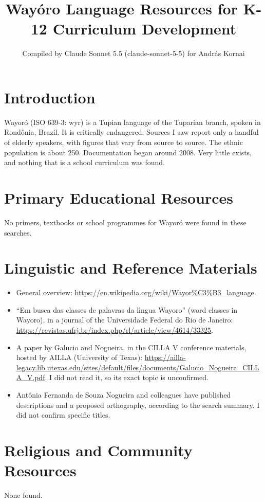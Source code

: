 \documentclass[12pt]{article}
\title{Way\'oro Language Resources for K-12 Curriculum Development}
\author{Compiled by Claude Sonnet 5.5 (claude-sonnet-5-5) for Andr\'as Kornai}
\date{}
\begin{document}
\maketitle

\section{Introduction}
Wayor\'o (ISO 639-3: wyr) is a Tupian language of the Tuparian branch, spoken in Rond\^onia, Brazil. It is critically endangered. Sources I saw report only a handful of elderly speakers, with figures that vary from source to source. The ethnic population is about 250. Documentation began around 2008. Very little exists, and nothing that is a school curriculum was found.

\section{Primary Educational Resources}
No primers, textbooks or school programmes for Wayor\'o were found in these searches.

\section{Linguistic and Reference Materials}
\begin{itemize}
\item General overview: \url{https://en.wikipedia.org/wiki/Wayor%C3%B3_language}.
\item ``Em busca das classes de palavras da l\'{\i}ngua Wayoro'' (word classes in Wayoro), in a journal of the Universidade Federal do Rio de Janeiro: \url{https://revistas.ufrj.br/index.php/rl/article/view/4614/33325}.
\item A paper by Galucio and Nogueira, in the CILLA V conference materials, hosted by AILLA (University of Texas): \url{https://ailla-legacy.lib.utexas.edu/sites/default/files/documents/Galucio_Nogueira_CILLA_V.pdf}. I did not read it, so its exact topic is unconfirmed.
\item Antônia Fernanda de Souza Nogueira and colleagues have published descriptions and a proposed orthography, according to the search summary. I did not confirm specific titles.
\end{itemize}

\section{Religious and Community Resources}
None found.
\end{document}

